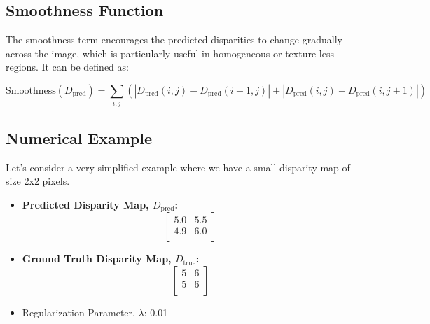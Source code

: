 \documentclass[22pt]{report}
\begin{document}
\vspace{12}
\subsection{Smoothness Function}
The smoothness term encourages the predicted disparities to change gradually across the image, which is particularly useful in homogeneous or texture-less regions. It can be defined as:
\begin{center}
    \[
    \text{Smoothness}(D_{\text{pred}}) = \sum_{i,j} \left( \left| D_{\text{pred}}(i,j) - D_{\text{pred}}(i+1,j) \right| + \left| D_{\text{pred}}(i,j) - D_{\text{pred}}(i,j+1) \right| \right)
    \]
\end{center}

\vspace{12}
\subsection*{Numerical Example}
Let's consider a very simplified example where we have a small disparity map of size 2x2 pixels.
\begin{itemize}
    \item \textbf{Predicted Disparity Map, \( D_{\text{pred}} \):}
            \[
            \begin{bmatrix}
            5.0 & 5.5 \\
            4.9 & 6.0 \\
            \end{bmatrix}
            \]
    \item \textbf{Ground Truth Disparity Map, \( D_{\text{true}} \):}
                \[
                \begin{bmatrix}
                5 & 6 \\
                5 & 6 \\
                \end{bmatrix}
                \]

    \item Regularization Parameter, \(\lambda\): 0.01
\end{itemize}
\vspace{10}
\end{document}
